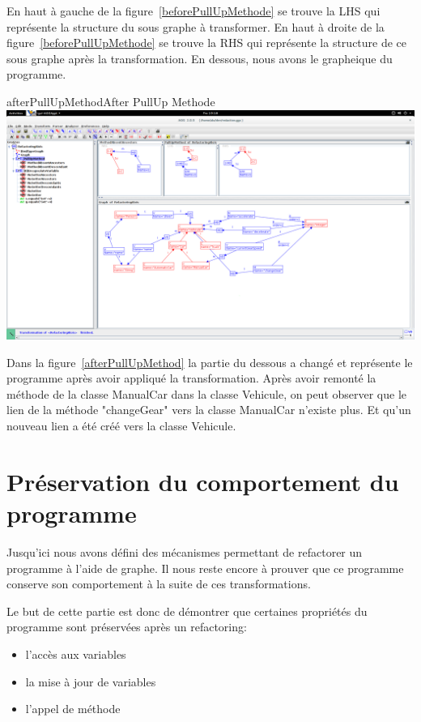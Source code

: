 \documentclass[a4paper, 12pt]{article}
\begin{document}
  En haut à gauche de la figure~\ref{beforePullUpMethode} se trouve la LHS qui représente la structure du sous graphe à transformer.
  En haut à droite de la figure~\ref{beforePullUpMethode} se trouve la RHS qui représente la structure de ce sous graphe après la transformation.
  En dessous, nous avons le grapheique du programme.

  \begin{myfig}{afterPullUpMethod}{After PullUp Methode}
    \includegraphics[width=\textwidth]{afterPullUpMethod.png}
  \end{myfig}

  Dans la figure~\ref{afterPullUpMethod} la partie du dessous a changé et représente le programme après avoir appliqué la transformation.
  Après avoir remonté la méthode de la classe ManualCar dans la classe Vehicule,
  on peut observer que le lien de la méthode "changeGear" vers la classe ManualCar n'existe plus. Et qu'un nouveau lien a été créé vers la classe Vehicule.

  \section{Préservation du comportement du programme}

  Jusqu'ici nous avons défini des mécanismes permettant de refactorer un programme à l'aide de graphe. Il nous reste encore à prouver que ce programme conserve son comportement à la suite de ces transformations.

  Le but de cette partie est donc de démontrer que certaines propriétés du programme sont préservées après un refactoring:
  \begin{itemize}[label=\textbullet]
    \item l'accès aux variables
    \item la mise à jour de variables
    \item l'appel de méthode
  \end{itemize}
\end{document}
